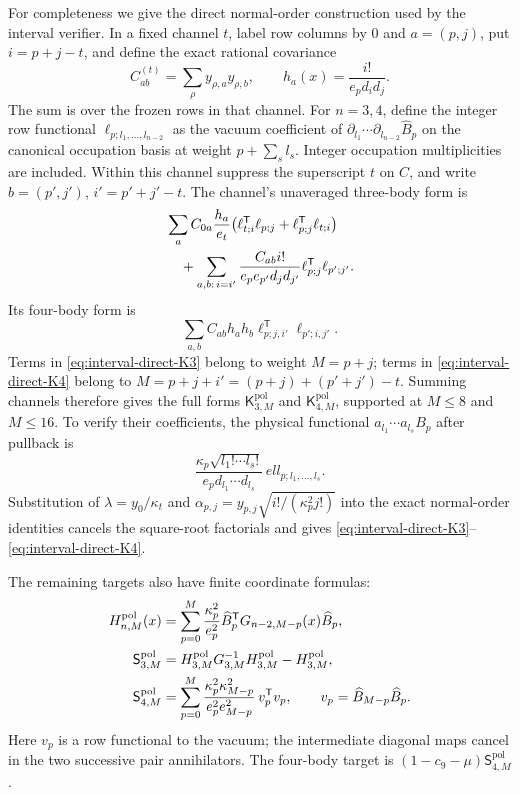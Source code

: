 For completeness we give the direct normal-order construction used by the
interval verifier. In a fixed channel $t$, label row columns by $0$ and
$a=(p,j)$, put $i=p+j-t$, and define the exact rational covariance
\begin{equation}\label{eq:interval-row-covariance}
 C_{ab}^{(t)}=\sum_\rho y_{\rho,a}y_{\rho,b},
 \qquad h_a(x)=\frac{i!}{e_p d_i d_j}.
\end{equation}
The sum is over the frozen rows in that channel. For $n=3,4$, define the
integer row functional $\ell_{p;l_1,\ldots,l_{n-2}}$ as the vacuum
coefficient of
$\partial_{l_1}\cdots\partial_{l_{n-2}}\widehat B_p$ on the canonical
occupation basis at weight $p+\sum_s l_s$. Integer occupation
multiplicities are included. Within this channel suppress the superscript
$t$ on $C$, and write $b=(p',j')$, $i'=p'+j'-t$. The channel's
unaveraged three-body form is
\begin{align}\label{eq:interval-direct-K3}
 &\sum_a C_{0a}\frac{h_a}{e_t}
   \big(\ell_{t;i}^{\mathsf T}\ell_{p;j}
         +\ell_{p;j}^{\mathsf T}\ell_{t;i}\big)\notag\\
 &\quad+\sum_{a,b:\,i=i'}
    \frac{C_{ab}i!}{e_p e_{p'}d_jd_{j'}}
       \ell_{p;j}^{\mathsf T}\ell_{p';j'}.
\end{align}
Its four-body form is
\begin{equation}\label{eq:interval-direct-K4}
 \sum_{a,b}C_{ab}h_ah_b
       \ell_{p;j,i'}^{\mathsf T}\ell_{p';i,j'}.
\end{equation}
Terms in \eqref{eq:interval-direct-K3} belong to weight $M=p+j$;
terms in \eqref{eq:interval-direct-K4} belong to
$M=p+j+i'=(p+j)+(p'+j')-t$. Summing channels therefore gives the full
forms $\mathsf K^{\mathrm{pol}}_{3,M}$ and
$\mathsf K^{\mathrm{pol}}_{4,M}$, supported at $M\le8$ and $M\le16$.
To verify their coefficients, the physical functional
$a_{l_1}\cdots a_{l_s}B_p$ after pullback is
\begin{equation}
 \frac{\kappa_p\sqrt{l_1!\cdots l_s!}}
 {e_p d_{l_1}\cdots d_{l_s}}\,ell_{p;l_1,\ldots,l_s}.
\end{equation}
Substitution of $\lambda=y_0/\kappa_t$ and
$\alpha_{p,j}=y_{p,j}\sqrt{i!/(\kappa_p^2j!)}$ into the exact
normal-order identities cancels the square-root factorials and gives
\eqref{eq:interval-direct-K3}--\eqref{eq:interval-direct-K4}.

The remaining targets also have finite coordinate formulas:
\begin{align}\label{eq:interval-target-forms}
 H^{\mathrm{pol}}_{n,M}(x)
 &=\sum_{p=0}^M\frac{\kappa_p^2}{e_p^2}
    \widehat B_p^{\mathsf T}G_{n-2,M-p}(x)\widehat B_p,\notag\\
 \mathsf S^{\mathrm{pol}}_{3,M}
 &=H^{\mathrm{pol}}_{3,M}G_{3,M}^{-1}H^{\mathrm{pol}}_{3,M}
       -H^{\mathrm{pol}}_{3,M},\notag\\
 \mathsf S^{\mathrm{pol}}_{4,M}
 &=\sum_{p=0}^M\frac{\kappa_p^2\kappa_{M-p}^2}
                    {e_p^2 e_{M-p}^2}\,v_p^{\mathsf T}v_p,
 \qquad v_p=\widehat B_{M-p}\widehat B_p.
\end{align}
Here $v_p$ is a row functional to the vacuum; the intermediate diagonal
maps cancel in the two successive pair annihilators. The four-body target
is $(1-c_9-\mu)\mathsf S^{\mathrm{pol}}_{4,M}$.

